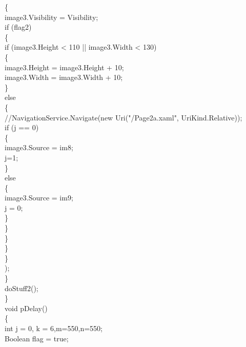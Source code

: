 {{                    \{\\
                        image3.Visibility = Visibility;\\
                        if (flag2)\\
                        \{\\
                            if (image3.Height < 110 || image3.Width < 130)\\
                            \{\\
                                image3.Height = image3.Height + 10;\\
                                image3.Width = image3.Width + 10;\\
                            \}\\
                            else\\
                            \{\\
                                //NavigationService.Navigate(new Uri("/Page2a.xaml", UriKind.Relative));\\
                                if (j == 0)\\
                                \{\\
                                    image3.Source = im8;\\
                                    j=1;\\
                                \}\\
                                else\\
                                \{\\
                                    image3.Source = im9;\\
                                    j = 0;\\
                                \}\\
                            \}\\
                        \}\\
                           
                        \}\\                     
                \}\\);\\
            \}\\
            doStuff2();\\
        \}\\

        void pDelay()\\
        \{\\
            int j = 0, k = 6,m=550,n=550;\\
            Boolean flag = true;\\
           


}}
